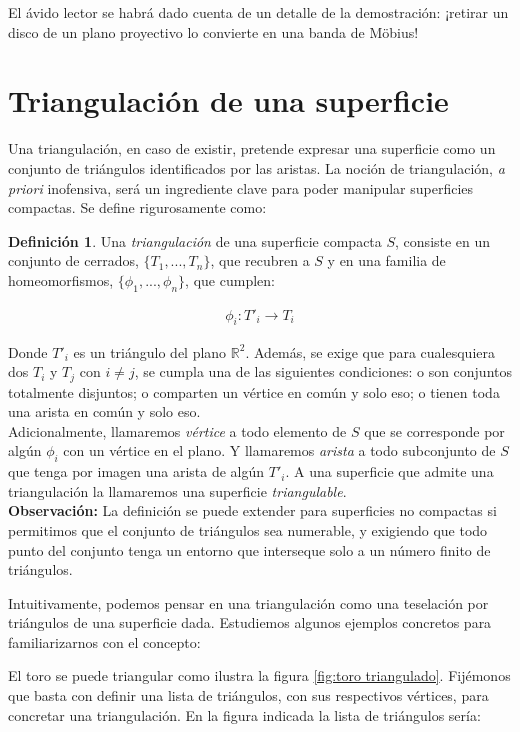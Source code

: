 \documentclass[a4paper,11pt,spanish, twoside, leqno]{tfg-uam}
\theoremstyle{definition}
\newtheorem{defin}[teor]{Definici\'on}
\begin{document}
El ávido lector se habrá dado cuenta de un detalle de la demostración: ¡retirar un disco de un plano proyectivo lo convierte en una banda de M\"obius!


\section{Triangulación de una superficie}
\label{seccion de triangulacion}
Una triangulación, en caso de existir, pretende expresar una superficie como un conjunto de triángulos identificados por las aristas. La noción de triangulación, \textit{a priori} inofensiva, será un ingrediente clave para poder manipular superficies compactas. Se define rigurosamente como:

\begin{defin}\label{defin:triangulacion}
Una \textit{triangulación} de una superficie compacta $S$, consiste en un conjunto de cerrados, $\{T_1, ..., T_n\}$, que recubren a $S$ y en una familia de homeomorfismos, $\{\phi_1, ..., \phi_n\}$, que cumplen:

\begin{align*}
	\phi_i: T'_i \longrightarrow T_i
\end{align*}

Donde $T'_i$ es un triángulo del plano $\mathbb{R}^2$.
Además, se exige que para cualesquiera dos $T_i$ y $T_j$ con $i\neq j$, se cumpla una de las siguientes condiciones: o son conjuntos totalmente disjuntos; o comparten un vértice en común y solo eso; o tienen toda una arista en común y solo eso.\\
Adicionalmente, llamaremos \textit{vértice} a todo elemento de $S$ que se corresponde por algún $\phi_i$ con un vértice en el plano. Y llamaremos \textit{arista} a todo subconjunto de $S$ que tenga por imagen una arista de algún $T'_i$. A una superficie que admite una triangulación la llamaremos una superficie \textit{triangulable}.\\
\textbf{Observación:} La definición se puede extender para superficies no compactas si permitimos que el conjunto de triángulos sea numerable, y exigiendo que todo punto del conjunto tenga un entorno que interseque solo a un número finito de triángulos.
\end{defin}


Intuitivamente, podemos pensar en una triangulación como una teselación por triángulos de una superficie dada. Estudiemos algunos ejemplos concretos para familiarizarnos con el concepto:

El toro se puede triangular como ilustra la figura  \ref{fig:toro triangulado}. Fijémonos que basta con definir una lista de triángulos, con sus respectivos vértices, para concretar una triangulación. En la figura indicada la lista de triángulos sería:
\end{document}
